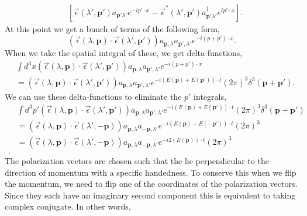 \documentclass[working, oneside]{../../../Preambles/tuftebook}
\begin{document}
\begin{solution}
\begin{align*}
                 &\left[\vec{\epsilon}(\lambda', \mathbf{p}')a_{\bm p'\lambda'} e^{-ip'\cdot x}-\vec{\epsilon}^{*}(\lambda',\mathbf{p}')a_{\bm p'\lambda'}^{\dagger} e^{ip'\cdot x} \right]
.\end{align*}
At this point we get a bunch of terms of the following form,
\[
\left(\vec{\epsilon}\left( \lambda, \mathbf{p} \right) \cdot \vec{\epsilon}\left( \lambda', \mathbf{p}' \right)   \right)   a_{\mathbf{p}, \lambda} a_{\mathbf{p}', \lambda'}e^{-i\left( p + p' \right) \cdot x}
.\] 
When we take the spatial integral of these, we get delta-functions,
\begin{align*}
    & \int d^{3}x  \left(\vec{\epsilon}\left( \lambda, \mathbf{p} \right) \cdot \vec{\epsilon}\left( \lambda', \mathbf{p}' \right)   \right)   a_{\mathbf{p}, \lambda} a_{\mathbf{p}', \lambda'}e^{-i\left( p + p' \right) \cdot x} \\
    &=   \left(\vec{\epsilon}\left( \lambda, \mathbf{p} \right) \cdot \vec{\epsilon}\left( \lambda', \mathbf{p}' \right)   \right)   a_{\mathbf{p}, \lambda} a_{\mathbf{p}', \lambda'}e^{-i\left( E\left( \mathbf{p} \right)  + E\left(   \mathbf{p}' \right)\right) \cdot t} \left( 2\pi \right) ^3 \delta^{3}\left( \mathbf{p} + \mathbf{p}' \right)
.\end{align*}
We can use these delta-functions to eliminate the $p'$ integrals,
 \begin{align*}
&\int d^3p' \left(\vec{\epsilon}\left( \lambda, \mathbf{p} \right) \cdot \vec{\epsilon}\left( \lambda', \mathbf{p}' \right)   \right)   a_{\mathbf{p}, \lambda} a_{\mathbf{p}', \lambda'}e^{-i\left( E\left( \mathbf{p} \right)  + E\left(   \mathbf{p}' \right)\right) \cdot t} \left( 2\pi \right) ^3 \delta^{3}\left( \mathbf{p} + \mathbf{p}' \right) \\
&= \left(\vec{\epsilon}\left( \lambda, \mathbf{p} \right) \cdot \vec{\epsilon}\left( \lambda', \mathbf{-p} \right)   \right)   a_{\mathbf{p}, \lambda} a_{\mathbf{-p}, \lambda'}e^{-i\left( E\left( \mathbf{p} \right)  + E\left(   \mathbf{-p}' \right)\right) \cdot t} \left( 2\pi \right) ^3  \\
&= \left(\vec{\epsilon}\left( \lambda, \mathbf{p} \right) \cdot \vec{\epsilon}\left( \lambda', \mathbf{-p} \right)   \right)   a_{\mathbf{p}, \lambda} a_{\mathbf{-p}, \lambda'}e^{-i 2\left( E\left( \mathbf{p} \right)\right) \cdot t} \left( 2\pi \right) ^3  \\
 .\end{align*} 
 The polarization vectors are chosen such that the lie perpendicular to the direction of momentum with a specific handedness. To conserve this when we flip the momentum, we need to flip one of the coordinates of the polarization vectors. Since they each have an imaginary second component this is equivalent to taking complex conjugate. In other words,

\end{solution}
\end{document}
